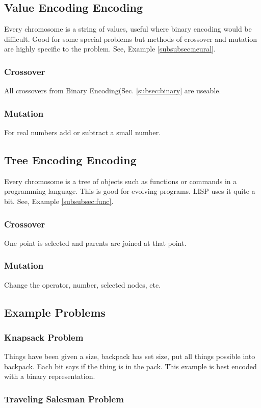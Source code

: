 \subsection{Value Encoding Encoding}
Every chromosome is a string of values, useful where binary encoding would be 
difficult. Good for some special problems but methods of crossover and mutation 
are highly specific to the problem. See, Example \ref{subsubsec:neural}.
\subsubsection{Crossover}
All crossovers from Binary Encoding(Sec. \ref{subsec:binary} are useable.
\subsubsection{Mutation}
For real numbers add or subtract a small number. 

\subsection{Tree Encoding Encoding}
Every chromosome is a tree of objects such as functions or commands in a 
programming language. This is good for evolving programs. LISP uses it quite 
a bit. See, Example \ref{subsubsec:func}.
\subsubsection{Crossover}
One point is selected and parents are joined at that point. 
\subsubsection{Mutation}
Change the operator, number, selected nodes, etc. 
\subsection{Example Problems}
\subsubsection{Knapsack Problem}
\label{subsubsec:knapsack}
Things have been given a size, backpack has set size, put all things possible 
into backpack. Each bit says if the thing is in the pack. This example is best 
encoded with a binary representation.

\subsubsection{Traveling Salesman Problem}
\label{subsubsec:salesman}

